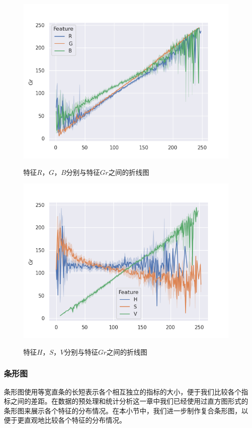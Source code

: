 \documentclass[UTF8]{ctexart}
\begin{document}
	\begin{figure}[htbp]
		\centering
		\caption{特征$R$，$G$，$B$分别与特征$Gr$之间的折线图}
		\includegraphics[width=1.0\textwidth]{line_r_g_b_gr_round.png}
		\label{Fig.22}
	\end{figure}
	
	\begin{figure}[htbp]
		\centering
		\caption{特征$H$，$S$，$V$分别与特征$Gr$之间的折线图}
		\includegraphics[width=1.0\textwidth]{line_h_s_v_gr_round.png}
		\label{Fig.23}
	\end{figure}

	\subsubsection{条形图}
	条形图使用等宽直条的长短表示各个相互独立的指标的大小，便于我们比较各个指标之间的差距。在数据的预处理和统计分析这一章中我们已经使用过直方图形式的条形图来展示各个特征的分布情况。在本小节中，我们进一步制作复合条形图，以便于更直观地比较各个特征的分布情况。
	
\end{document}
